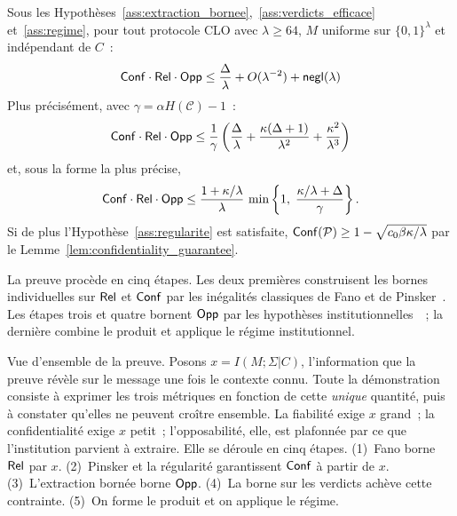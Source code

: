 \begin{sloppypar}
\begin{theorem}
\label{thm:trilemme_cro_conditionnel}
Sous les Hypoth\`eses~\ref{ass:extraction_bornee},~\ref{ass:verdicts_efficace}
et~\ref{ass:regime}, pour tout protocole CLO avec
$\lambda \geq 64$, $M$ uniforme sur $\{0,1\}^\lambda$ et ind\'ependant de $C$~:
\begin{equation}
\mathsf{Conf} \cdot \mathsf{Rel} \cdot \mathsf{Opp} \leq \frac{\Delta}{\lambda} + O(\lambda^{-2}) + \mathsf{negl}(\lambda)
\label{eq:trilemme_cro_conditionnel}
\end{equation}
Plus pr\'ecis\'ement, avec $\gamma = \alpha H(\mathcal{C}) - 1$~:
\begin{equation}
\mathsf{Conf} \cdot \mathsf{Rel} \cdot \mathsf{Opp} \leq \frac{1}{\gamma}\left(\frac{\Delta}{\lambda}
+ \frac{\kappa(\Delta+1)}{\lambda^2} + \frac{\kappa^2}{\lambda^3}\right)
\label{eq:trilemme_cro_explicite}
\end{equation}
et, sous la forme la plus pr\'ecise,
\begin{equation}
\mathsf{Conf} \cdot \mathsf{Rel} \cdot \mathsf{Opp} \leq \frac{1+\kappa/\lambda}{\lambda}\,
  \min\left\{1,\; \frac{\kappa/\lambda + \Delta}{\gamma}\right\}.
\label{eq:trilemme_cro_raffine}
\end{equation}
Si de plus l'Hypoth\`ese~\ref{ass:regularite} est satisfaite,
$\mathsf{Conf}(\mathcal{P}) \geq 1 - \sqrt{c_0 \beta \kappa/\lambda}$
par le Lemme~\ref{lem:confidentiality_guarantee}.
\end{theorem}

La preuve proc\`ede en cinq \'etapes. Les deux premi\`eres construisent les bornes
individuelles sur $\mathsf{Rel}$ et $\mathsf{Conf}$ par les in\'egalit\'es classiques de Fano et de
Pinsker~\cite{Fano61,CoverThomas06,Pinsker1964,Tsybakov2009}. Les \'etapes trois et quatre bornent $\mathsf{Opp}$ par les hypoth\`eses
institutionnelles~\cite{Simon82,Miller56}~; la derni\`ere combine le produit et applique
le r\'egime institutionnel.

\begin{Preuve}\label{prv:cro_classique}

\begin{cmtEtape}{Vue d'ensemble de la preuve.}
Posons $x = I(M;\Sigma|C)$, l'information que la preuve r\'ev\`ele sur le
message une fois le contexte connu. Toute la d\'emonstration consiste \`a
exprimer les trois m\'etriques en fonction de cette \emph{unique} quantit\'e,
puis \`a constater qu'elles ne peuvent cro\^itre ensemble. La fiabilit\'e
exige $x$ grand~; la confidentialit\'e exige $x$ petit~; l'opposabilit\'e,
elle, est plafonn\'ee par ce que l'institution parvient \`a extraire. Elle se
d\'eroule en cinq \'etapes. (1)~Fano borne $\mathsf{Rel}$ par $x$. (2)~Pinsker et la r\'egularit\'e
garantissent $\mathsf{Conf}$ \`a partir de $x$. (3)~L'extraction born\'ee borne
$\mathsf{Opp}$. (4)~La borne sur les verdicts ach\`eve cette contrainte.
(5)~On forme le produit et on applique le r\'egime.
\end{cmtEtape}


\end{Preuve}
\end{sloppypar}
